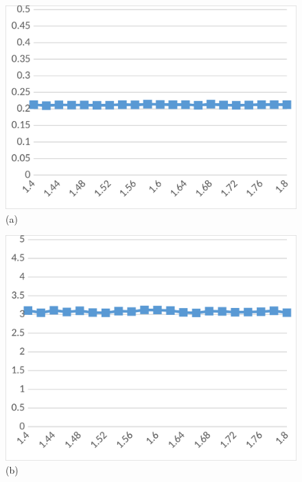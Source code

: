\begin{figure}[H]
  \begin{minipage}{0.32\textwidth}
    \centering
    \includegraphics[width=\textwidth]{figs/inv_ql_fifo.png}
    (a)
  \end{minipage}\hspace{0.01\textwidth}
  \begin{minipage}{0.32\textwidth}
    \centering
    \includegraphics[width=\textwidth]{figs/inv_ql_normal.png}
    (b)
  \end{minipage}\hspace{0.01\textwidth}
  \begin{minipage}{0.32\textwidth}
    \centering

\end{minipage}
\end{figure}
